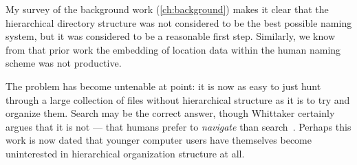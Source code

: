 My survey of the background work (\autoref{ch:background}) makes it clear that
the hierarchical directory structure was not considered to be the best possible
naming system, but it was considered to be a reasonable first step.  Similarly,
we know from that prior work the embedding of location data within the human
naming scheme was not productive.

The problem has become untenable at point: it is now as easy to just hunt
through a large collection of files without hierarchical structure as it is to
try and organize them.  Search may be the correct answer, though Whittaker
certainly argues that it is not --- that humans prefer to \emph{navigate} than
search~\cite{bergman2019search,bergman2019factors}.  Perhaps this work is now
dated that younger computer users have themselves become uninterested in
hierarchical organization structure at all.

